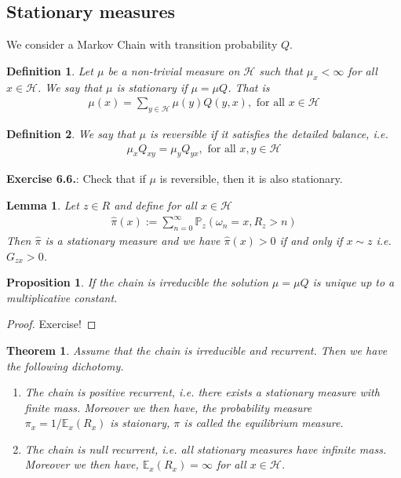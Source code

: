 \documentclass[11pt,a4paper, final]{article}
\newtheorem{lem}{Lemma}[section]
\newtheorem{thm}{Theorem}[section]
\newtheorem{prop}{Proposition}[section]
\newtheorem{defn}{Definition}[section]
\theoremstyle{definition}
\begin{document}
\subsection{Stationary measures}
We consider a Markov Chain with transition probability $Q$. 
\begin{defn} Let $\mu$ be a non-trivial measure on $\mathcal{H}$ such that $\mu_x< \infty$ for all $x \in \mathcal{H}$. We say that $\mu$ is stationary if $\mu = \mu Q$.  That is
\begin{align*}
\mu (x) =  \sum_{y \in \mathcal{H}} \mu(y) Q(y,x), \text{ for all } x \in \mathcal{H}
\end{align*}
\end{defn}
\begin{defn} We say that $\mu$ is reversible if it satisfies the detailed balance, i.e. 
\begin{align*}
\mu_x Q_{xy} = \mu_y Q_{yx}, \text{ for all } x,y \in  \mathcal{H}
\end{align*}
\end{defn}
\noindent \textbf{Exercise 6.6.}: Check that if $\mu$ is reversible, then it is also stationary. 
\begin{lem} Let $z \in R$ and define for all $x \in \mathcal{H}$
\begin{align*}
\hat{\pi}(x):= \sum_{n=0}^\infty \mathbb{P}_z ( \omega_n =x, R_z >n )
\end{align*}
Then $\hat{\pi}$ is a stationary measure and we have $\hat{\pi}(x) >0 $ if and only if $x \sim z$ i.e. $G_{zx}>0$. 
\end{lem}
\begin{prop} If the chain is irreducible the solution $\mu = \mu Q$ is unique up to a multiplicative constant. 
\end{prop}
\begin{proof}
Exercise! 
\end{proof}
\begin{thm} Assume that the chain is irreducible and recurrent. Then we have the following dichotomy. 
\begin{enumerate}
\item The chain is positive recurrent, i.e. there exists a stationary measure with finite mass. Moreover we then have, the probability measure \\ $ \pi_x = 1/ \mathbb{E}_x(R_x)$ is staionary, $\pi$ is called the equilibrium measure. 
\item The chain is null recurrent, i.e. all stationary measures have infinite mass. Moreover we then have, $\mathbb{E}_x(R_x) =  \infty$ for all $x \in \mathcal{H}$. 
\end{enumerate}
\end{thm}
\end{document}
